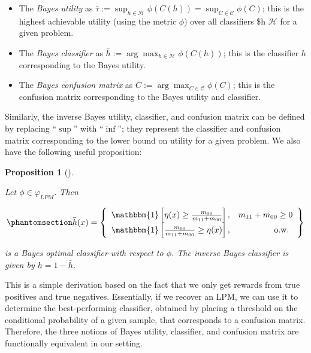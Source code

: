 \documentclass[
  letterpaper,
  numbers=noenddot,
  DIV=11]{scrreprt}
\providecommand{\tightlist}{%
  \setlength{\itemsep}{0pt}\setlength{\parskip}{0pt}}\usepackage{longtable,booktabs,array}
\theoremstyle{plain}
\newtheorem{proposition}{Proposition}[chapter]
\theoremstyle{definition}
\theoremstyle{remark}
\begin{document}
\begin{itemize}
\tightlist
\item
  The \emph{Bayes utility} as
  \(\bar{\tau} := \sup_{h \in \mathcal{H}} \phi(C(h)) = \sup_{C \in \mathcal{C}} \phi(C)\);
  this is the highest achievable utility (using the metric \(\phi\))
  over all classifiers \$h \in \(\mathcal{H}\) for a given problem.
\item
  The \emph{Bayes classifier} as
  \(\bar{h} := \arg \max_{h \in \mathcal{H}} \phi(C(h))\); this is the
  classifier \(h\) corresponding to the Bayes utility.
\item
  The \emph{Bayes confusion matrix} as
  \(\bar{C} := \arg \max_{C \in \mathcal{C}} \phi(C)\); this is the
  confusion matrix corresponding to the Bayes utility and classifier.
\end{itemize}

Similarly, the inverse Bayes utility, classifier, and confusion matrix
can be defined by replacing ``\(\sup\)'' with ``\(\inf\)''; they
represent the classifier and confusion matrix corresponding to the lower
bound on utility for a given problem. We also have the following useful
proposition:

\begin{tcolorbox}[colframe=.grey, title=\faPenSquare \enspace Proposition]

\begin{proposition}[]\protect\hypertarget{prp-prp3.1}{}\label{prp-prp3.1}

Let \(\phi \in \varphi_{LPM}\). Then

\begin{equation}\phantomsection\label{eq-eq3.46}{\bar{h}(x) = \left\{\begin{array}{lr}
\mathbbm{1}\left[\eta(x) \geq \frac{m_{00}}{m_{11} + m_{00}}\right], & m_{11} + m_{00} \geq 0 \\
\mathbbm{1}\left[\frac{m_{00}}{m_{11} + m_{00}} \geq \eta(x)\right], & \text { o.w. }
\end{array}\right\}}\end{equation}

is a Bayes optimal classifier with respect to \(\phi\). The inverse
Bayes classifier is given by \(\underline{h} = 1 - \bar{h}\).

\end{proposition}

\end{tcolorbox}

This is a simple derivation based on the fact that we only get rewards
from true positives and true negatives. Essentially, if we recover an
LPM, we can use it to determine the best-performing classifier, obtained
by placing a threshold on the conditional probability of a given sample,
that corresponds to a confusion matrix. Therefore, the three notions of
Bayes utility, classifier, and confusion matrix are functionally
equivalent in our setting.
\end{document}
